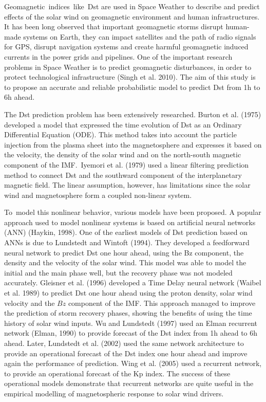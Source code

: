 Geomagnetic\ indices\ like\ Dst are used in Space Weather to describe and predict effects of the solar wind on 
geomagnetic environment and human infrastructures. It has been long observed that important geomagnetic storms 
disrupt human-made systems on Earth, they can impact satellites and the path of radio signals for GPS, 
disrupt navigation systems and create harmful geomagnetic induced currents in the power grids and pipelines. 
One of the important research problems in Space Weather is to predict geomagnetic disturbances, in order  
to protect technological infrastructure  (Singh et al. 2010). The aim of this study is to propose an  accurate 
and reliable probabilistic model to predict Dst from 1h to 6h ahead. 

The Dst prediction problem has been extensively researched. Burton et al. (1975) developed a model that expressed 
the time evolution of Dst as an Ordinary Differential Equation (ODE). This method takes into account the particle 
injection from the plasma sheet into the magnetosphere and expresses it based on the velocity, the density of the 
solar wind and on the north-south magnetic component of the IMF.\ Iyemori et al. (1979) used a linear filtering 
prediction method to connect Dst and the southward component of the interplanetary magnetic field. The linear 
assumption, however, has limitations since  the solar wind and magnetosphere form a coupled non-linear system. 

To\ model this nonlinear behavior, various models have been proposed. A popular  approach used to model 
nonlinear systems is based on artificial neural networks (ANN) (Haykin, 1998). One of the earliest models of 
Dst prediction based on ANNs is due to Lundstedt and Wintoft (1994). They developed a feedforward neural 
network to predict Dst one hour ahead, using the Bz component, the density and the velocity of the solar wind. 
This model was able to model the initial and the main phase well, but the recovery phase was not modeled accurately. 
Gleisner et al. (1996) developed a Time Delay neural network (Waibel et al. 1989) to predict Dst one hour ahead 
using the proton density, solar wind velocity and the  \( Bz  \) component of the IMF. This approach 
managed to improve the prediction of storm recovery phases, showing the benefits of using the time history of 
solar wind inputs. Wu and Lundstedt (1997) used an Elman recurrent network (Elman, 1990) to provide forecast of 
the Dst index from 1h ahead to 6h ahead. Later, Lundstedt et al. (2002) used the same network architecture to 
provide an operational forecast of the Dst index one hour ahead and improve again the performance of prediction. 
Wing et al. (2005) used a recurrent network, to provide an operational forecast of the Kp index. The success of 
these operational models demonstrate that recurrent networks are quite useful in the empirical modelling of 
magnetospheric response to solar wind drivers. 

